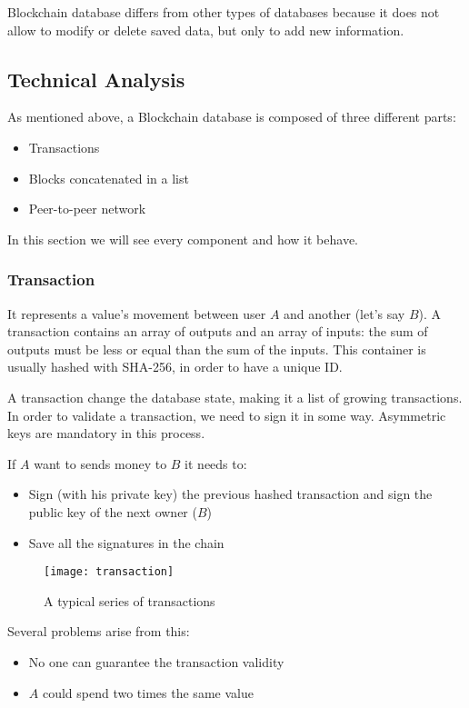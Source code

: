 Blockchain database differs from other types of databases because it does not
allow to modify or delete saved data, but only to add new information.

\subsection{Technical Analysis}

As mentioned above, a Blockchain database is composed of three different
parts\cite{sok15}:
\begin{itemize}
 \item Transactions
 \item Blocks concatenated in a list
 \item Peer-to-peer network
\end{itemize}

In this section we will see every component and how it behave.

\subsubsection{Transaction}
It represents a value's movement between user $A$ and another (let's
say $B$). A transaction contains an array of outputs and an array of
inputs\cite{sok15}: the sum of outputs must be less or equal than the sum of
the inputs.
This container is usually hashed with SHA-256, in order to have a
unique ID.

A transaction change the database state, making it a list of growing
transactions.
In order to validate a transaction, we need to sign it in some way. Asymmetric
keys are mandatory in this process.

If $A$ want to sends money to $B$ it needs to:
\begin{itemize}
 \item Sign (with his private key) the previous hashed transaction and sign the
public key of the next owner ($B$)
 \item Save all the signatures in the chain
\end{itemize}

\begin{figure}[h]
 \centering
 \texttt{[image: transaction]}
 \caption{A typical series of transactions}
\end{figure}

Several problems arise from this:
\begin{itemize}
 \item No one can guarantee the transaction validity
 \item $A$ could spend two times the same value
\end{itemize}

